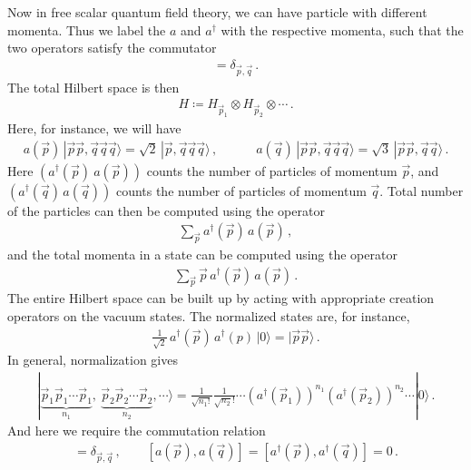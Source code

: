 \documentclass[11pt, onesided]{book}
\theoremstyle{break}
\theoremstyle{break}
\begin{document}
Now in free scalar quantum field theory, we can have particle with different momenta. Thus we label the $a$ and $a^\dagger$ with the respective momenta, such that the two operators satisfy the commutator
\begin{align*}
[a(\vec{p}), \, a^\dagger (\vec{q})] = \delta_{\vec{p},\vec{q}}\,.
\end{align*}
The total Hilbert space is then 
\begin{align*}
H \coloneqq H_{\vec{p}_1} \otimes H_{\vec{p}_2} \otimes \cdots \,.
\end{align*}
Here, for instance, we will have
\begin{align*}
a(\vec{p}) \, |\vec{p}\vec{p},\vec{q}\vec{q}\vec{q} \rangle = \sqrt{2}\, |\vec{p},\vec{q}\vec{q}\vec{q}\rangle \,, \quad\qquad
a(\vec{q}) \, |\vec{p}\vec{p},\vec{q}\vec{q}\vec{q} \rangle = \sqrt{3}\, |\vec{p}\vec{p},\vec{q}\vec{q}\rangle \,.
\end{align*}
Here $(a^\dagger(\vec{p})\ a(\vec{p}))$ counts the number of particles of momentum $\vec{p}$, and $(a^\dagger(\vec{q})\, a(\vec{q}))$ counts the number of particles of momentum $\vec{q}$. Total number of the particles can then be computed using the operator
\begin{align*}
\sum_{\vec{p}} a^\dagger(\vec{p}) \, a(\vec{p})\,,
\end{align*}
and the total momenta in a state can be computed using the operator 
\begin{align*}
\sum_{\vec{p}} \vec{p}\, a^\dagger(\vec{p}) \, a(\vec{p})\,.
\end{align*}
The entire Hilbert space can be built up by acting with appropriate creation operators on the vacuum states. The normalized states are, for instance,
\begin{align*}
\frac{1}{\sqrt{2}}\, a^\dagger(\vec{p})\, a^\dagger(p)\, |0\rangle = |\vec{p}\vec{p}\rangle\,.
\end{align*} 
In general, normalization gives
\begin{align*}
|\underbrace{\vec{p}_1\vec{p}_1\cdots \vec{p}_1}_{n_1},\ \underbrace{\vec{p}_2\vec{p}_2\cdots \vec{p}_2}_{n_2}, \cdots \rangle = \frac{1}{\sqrt{n_1 !}} \frac{1}{\sqrt{n_2}!}\cdots \left(a^\dagger (\vec{p}_1) \right)^{n_1}
\left(a^\dagger (\vec{p}_2) \right)^{n_2} \cdots |0\rangle\,.
\end{align*}
And here we require the commutation relation
\begin{align*}
[a(\vec{p}),\, a^\dagger(\vec{q})] = \delta_{\vec{p},\vec{q}}\,, \qquad 
[a(\vec{p}), a(\vec{q})] = [a^\dagger(\vec{p}), a^\dagger(\vec{q})] = 0\,.
\end{align*}
\end{document}
